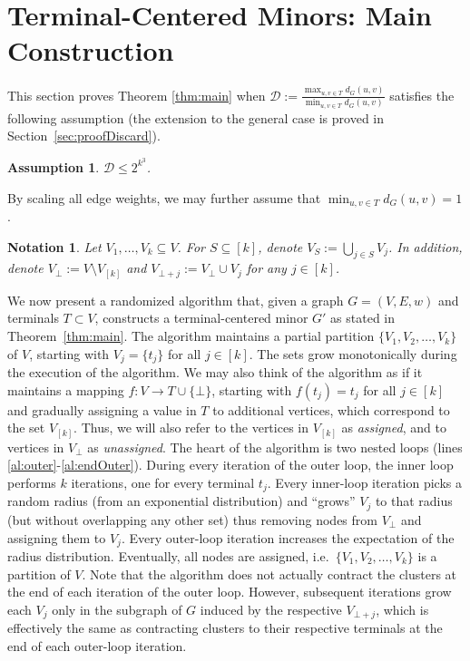 \documentclass[twoside,leqno,twocolumn]{article}
\newtheorem{assumption}[Definition]{Assumption}
\newtheorem{notation}[Definition]{Notation}
\newtheorem{assumption}[theorem]{Assumption}
\newtheorem{notation}[theorem]{Notation}
\providecommand{\eqdef}{:=}
\newcommand{\calD}{{\mathcal D}}
\begin{document}
\section{Terminal-Centered Minors: Main Construction} \label{sec:TCM}

This section proves Theorem \ref{thm:main} when 
$\calD \eqdef \frac{\max_{u,v \in T}{d_G(u,v)}}{\min_{u,v \in T}{d_G(u,v)}}$
satisfies the following assumption 
(the extension to the general case is proved in Section~\ref{sec:proofDiscard}).
\begin{assumption} \label{a:polyLogDelta}
$\calD \le 2^{k^3}$.
\end{assumption}
By scaling all edge weights, we may further assume that 
$\min_{u,v \in T}{d_G(u,v)} = 1$.

\begin{notation}
Let $V_1, \ldots, V_k \subseteq V$.
For $S \subseteq [k]$, denote $V_S \eqdef \bigcup_{j \in S}V_j$. 
In addition, denote $V_\bot \eqdef V \setminus V_{[k]}$ 
and $V_{\bot+j} \eqdef V_\bot \cup V_j$ for any $j \in [k]$. 
\end{notation}

We now present a randomized algorithm that, 
given a graph $G=(V,E,w)$ and terminals $T\subset V$,
constructs a terminal-centered minor $G'$ as stated in Theorem~\ref{thm:main}.
The algorithm maintains a partial partition $\{V_1,V_2,\ldots,V_k\}$ of $V$, 
starting with $V_j = \{t_j\}$ for all $j \in [k]$. 
The sets grow monotonically during the execution of the algorithm. 
We may also think of the algorithm as if it maintains a mapping 
$f : V \to T \cup \{\bot\}$, 
starting with $f(t_j)=t_j$ for all $j \in [k]$ and gradually assigning a value in $T$ 
to additional vertices, which correspond to the set $V_{[k]}$. 
Thus, we will also refer to the vertices in $V_{[k]}$ as {\em assigned}, 
and to vertices in $V_\bot$ as {\em unassigned}.
The heart of the algorithm is two nested loops (lines \ref{al:outer}-\ref{al:endOuter}). During every iteration of the outer loop, the inner loop performs $k$ iterations, one for every terminal $t_j$. 
Every inner-loop iteration picks a random radius (from an exponential distribution) 
and ``grows'' $V_j$ to that radius (but without overlapping any other set) thus removing nodes from $V_\bot$ and assigning them to $V_j$. 
Every outer-loop iteration increases the expectation of the radius distribution.
Eventually, all nodes are assigned, 
i.e.\ $\{V_1,V_2,\ldots,V_k\}$ is a partition of $V$.
Note that the algorithm does not actually contract the clusters at the end of each iteration of the outer loop. 
However, subsequent iterations grow each $V_j$ 
only in the subgraph of $G$ induced by the respective $V_{\bot+j}$,
which is effectively the same as contracting clusters to their respective terminals at the end of each outer-loop iteration.
\end{document}

